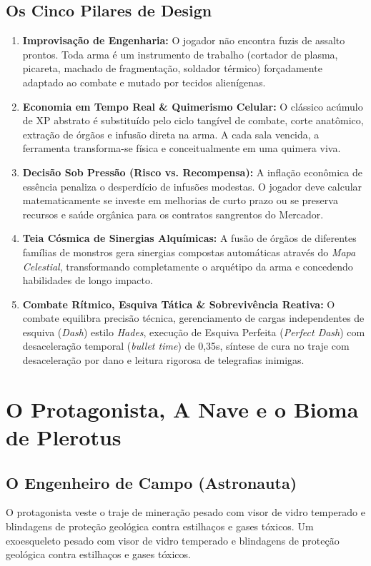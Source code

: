 \documentclass[a4paper,12pt]{report}
\begin{document}
\section{Os Cinco Pilares de Design}
\begin{enumerate}
    \item \textbf{Improvisação de Engenharia:} O jogador não encontra fuzis de assalto prontos. Toda arma é um instrumento de trabalho (cortador de plasma, picareta, machado de fragmentação, soldador térmico) forçadamente adaptado ao combate e mutado por tecidos alienígenas.
    \item \textbf{Economia em Tempo Real \& Quimerismo Celular:} O clássico acúmulo de XP abstrato é substituído pelo ciclo tangível de combate, corte anatômico, extração de órgãos e infusão direta na arma. A cada sala vencida, a ferramenta transforma-se física e conceitualmente em uma quimera viva.
    \item \textbf{Decisão Sob Pressão (Risco vs. Recompensa):} A inflação econômica de essência penaliza o desperdício de infusões modestas. O jogador deve calcular matematicamente se investe em melhorias de curto prazo ou se preserva recursos e saúde orgânica para os contratos sangrentos do Mercador.
    \item \textbf{Teia Cósmica de Sinergias Alquímicas:} A fusão de órgãos de diferentes famílias de monstros gera sinergias compostas automáticas através do \textit{Mapa Celestial}, transformando completamente o arquétipo da arma e concedendo habilidades de longo impacto.
    \item \textbf{Combate Rítmico, Esquiva Tática \& Sobrevivência Reativa:} O combate equilibra precisão técnica, gerenciamento de cargas independentes de esquiva (\textit{Dash}) estilo \textit{Hades}, execução de Esquiva Perfeita (\textit{Perfect Dash}) com desaceleração temporal (\textit{bullet time}) de 0,35s, síntese de cura no traje com desaceleração por dano e leitura rigorosa de telegrafias inimigas.
\end{enumerate}

\chapter{O Protagonista, A Nave e o Bioma de Plerotus}

\section{O Engenheiro de Campo (Astronauta)}
O protagonista veste o traje de mineração pesado com visor de vidro temperado e blindagens de proteção geológica contra estilhaços e gases tóxicos. Um exoesqueleto pesado com visor de vidro temperado e blindagens de proteção geológica contra estilhaços e gases tóxicos.
\end{document}
